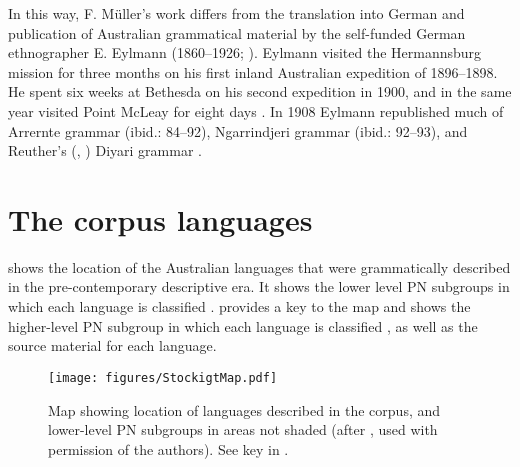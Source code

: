 In this way, F. Müller’s work differs from the translation into German and publication of Australian grammatical material by the self-funded German ethnographer E. Eylmann (1860--1926; \citeyear{eylmann_eingeborenen_1908}). Eylmann visited the Hermannsburg mission for three months on his first inland Australian expedition of 1896--1898. He spent six weeks at Bethesda on his second expedition in 1900, and in the same year visited Point McLeay for eight days \citep[193--194]{schroder_erhard_2011}. In 1908 Eylmann republished much of  Arrernte grammar (ibid.: 84--92),  Ngarrindjeri grammar (ibid.: 92--93), and Reuther’s (\citeyear{reuther_dieri_1894}, \citeyear{reuther_reuther_1899}) Diyari grammar \citep[93--98]{reuther_ms_1899}. 

\section{The corpus languages} 
\label{sec:key:1.2}

 shows the location of the Australian languages that were grammatically described in the pre-contemporary descriptive era. It shows the lower level PN subgroups in which each language is classified \citep[820]{bowern_computational_2012}.  provides a key to the map and shows the higher-level PN subgroup in which each language is classified \citep{bowern_computational_2012}, as well as the source material for each language.

\begin{figure}
\texttt{[image: figures/StockigtMap.pdf]}
\caption{Map showing location of languages described in the corpus, and lower-level PN subgroups in areas not shaded (after \citealt[820]{bowern_computational_2012}, used with permission of the authors). See key in .}
\label{fig:key:1-3}
\end{figure} 

